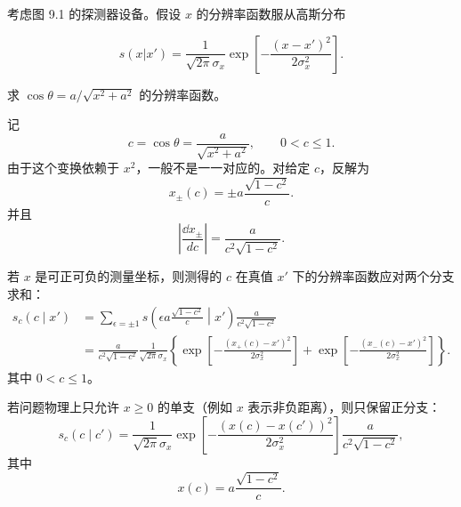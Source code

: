 ﻿


\begin{question}
考虑图 9.1 的探测器设备。假设 \(x\) 的分辨率函数服从高斯分布

\[
s(x|x')=\frac{1}{\sqrt{2\pi}\sigma_x}\exp\left[-\frac{(x-x')^2}{2\sigma_x^2}\right].
\]

求 \(\cos\theta=a/\sqrt{x^2+a^2}\) 的分辨率函数。
\begin{solution}
记
\[
c=\cos\theta=\frac{a}{\sqrt{x^2+a^2}},
\qquad 0<c\le1.
\]
由于这个变换依赖于 \(x^2\)，一般不是一一对应的。对给定 \(c\)，反解为
\[
x_\pm(c)=\pm a\frac{\sqrt{1-c^2}}{c}.
\]
并且
\[
\left|\frac{\dd{x}_\pm}{dc}\right|
=\frac{a}{c^2\sqrt{1-c^2}}.
\]

若 \(x\) 是可正可负的测量坐标，则测得的 \(c\) 在真值 \(x'\) 下的分辨率函数应对两个分支求和：
\[
\begin{split}
s_c(c\mid x')
&=\sum_{\epsilon=\pm1}
 s\left(\epsilon a\frac{\sqrt{1-c^2}}{c}\middle|x'\right)
 \frac{a}{c^2\sqrt{1-c^2}}\\
&=\frac{a}{c^2\sqrt{1-c^2}}
\frac{1}{\sqrt{2\pi}\sigma_x}
\left\{
\exp\left[-\frac{(x_+(c)-x')^2}{2\sigma_x^2}\right]
+
\exp\left[-\frac{(x_-(c)-x')^2}{2\sigma_x^2}\right]
\right\}.
\end{split}
\]
其中 \(0<c\le1\)。

若问题物理上只允许 \(x\ge0\) 的单支（例如 \(x\) 表示非负距离），则只保留正分支：
\[
s_c(c\mid c')=
\frac{1}{\sqrt{2\pi}\sigma_x}
\exp\left[-\frac{(x(c)-x(c'))^2}{2\sigma_x^2}\right]
\frac{a}{c^2\sqrt{1-c^2}},
\]
其中
\[
x(c)=a\frac{\sqrt{1-c^2}}{c}.
\]
\end{solution}
\end{question}


